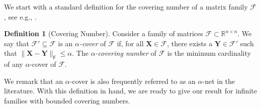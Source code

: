 \documentclass{article}[11pt]
\theoremstyle{definition}
\newtheorem{definition}{Definition}
\newcommand{\bv}[1]{\boldsymbol{\mathbf{#1}}}
\newcommand{\R}{\mathbb{R}}
\newcommand{\Fro}{\mathsf{F}}
\newcommand{\F}{\mathcal{F}}
\begin{document}
We start with a standard definition for the covering number of a matrix family $\mathcal{F}$, see e.g., \cite{Vershynin2018}.

        \begin{definition}[Covering Number]\label{def:cover}
            Consider a family of matrices $\F \subset \R^{n \times n}$. We say that $\mathcal{F}' \subseteq \mathcal{F}$ is an \emph{$\alpha$-cover} of $\mathcal{F}$ if, for all $\bv{X} \in \mathcal{F}$, there exists a $\bv{Y} \in \mathcal{F}'$ such that $\|\bv{X} - \bv{Y}\|_\Fro \leq \alpha$. The \emph{$\alpha$-covering number} of $\mathcal{F}$ is the minimum cardinality of any $\alpha$-cover of $\mathcal{F}$.
        \end{definition}

        We remark that an $\alpha$-cover is also frequently referred to as an $\alpha$-net in the literature. With this definition in hand, we are ready to give our result for infinite families with bounded covering numbers.
\end{document}
